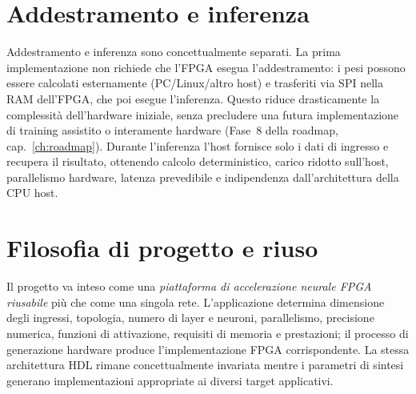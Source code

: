 \section{Addestramento e inferenza}
Addestramento e inferenza sono concettualmente separati. La prima implementazione non
richiede che l'FPGA esegua l'addestramento: i pesi possono essere calcolati
esternamente (PC/Linux/altro host) e trasferiti via SPI nella RAM dell'FPGA, che poi
esegue l'inferenza. Questo riduce drasticamente la complessità dell'hardware iniziale,
senza precludere una futura implementazione di training assistito o interamente
hardware (Fase~8 della roadmap, cap.~\ref{ch:roadmap}). Durante l'inferenza l'host
fornisce solo i dati di ingresso e recupera il risultato, ottenendo calcolo
deterministico, carico ridotto sull'host, parallelismo hardware, latenza prevedibile e
indipendenza dall'architettura della CPU host.

\section{Filosofia di progetto e riuso}
Il progetto va inteso come una \emph{piattaforma di accelerazione neurale FPGA
riusabile} più che come una singola rete. L'applicazione determina dimensione degli
ingressi, topologia, numero di layer e neuroni, parallelismo, precisione numerica,
funzioni di attivazione, requisiti di memoria e prestazioni; il processo di
generazione hardware produce l'implementazione FPGA corrispondente. La stessa
architettura HDL rimane concettualmente invariata mentre i parametri di sintesi
generano implementazioni appropriate ai diversi target applicativi.
